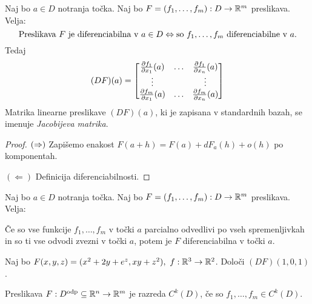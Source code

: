 \begin{izrek}
    Naj bo $a \in D$ notranja točka. Naj bo $F = (f_1, \ldots, f_m): D \to \mathbb{R}^m$ preslikava. Velja: 
    $$\text{Preslikava } F \text{ je diferenciabilna v } a \in D \Leftrightarrow \text{so } f_1, \ldots, f_m \text{ diferenciabilne v } a.$$
    Tedaj
    $$(DF)(a) = \begin{bmatrix}
        \frac{\partial f_1}{\partial x_1}(a) & \ldots & \frac{\partial f_1}{\partial x_n}(a) \\
        \vdots & & \vdots \\
        \frac{\partial f_m}{\partial x_1}(a) & \ldots & \frac{\partial f_m}{\partial x_n}(a) 
    \end{bmatrix}$$
    Matrika linearne preslikave $(DF)(a)$, ki je zapisana v standardnih bazah, se imenuje \emph{Jacobijeva matrika}.
\end{izrek}

\begin{proof}
    $(\Rightarrow)$ Zapišemo enakost $F(a+h) = F(a) + dF_a(h) + o(h)$ po komponentah.

    $(\Leftarrow)$ Definicija diferenciabilnosti.
\end{proof}

\begin{posledica}
    Naj bo $a \in D$ notranja točka. Naj bo $F = (f_1, \ldots, f_m): D \to \mathbb{R}^m$ preslikava. Velja:
    
    Če so vse funkcije $f_1, \ldots, f_m$ v točki $a$ parcialno odvedlivi po vseh spremenljivkah in so ti vse odvodi zvezni v točki $a$, potem je $F$ diferenciabilna v točki $a$.
\end{posledica}

\begin{zgled}
    Naj bo $F(x,y,z) = (x^2+2y+e^z, xy+z^2), \ f: \RR^3 \to \RR^2$. Določi $(DF)(1,0,1)$.
\end{zgled}

\begin{definicija}
    Preslikava $F: D^{\text{odp}} \subseteq \mathbb{R}^n \to \mathbb{R}^m$ je razreda $C^k(D)$, če so $f_1, \ldots, f_m \in C^k(D)$.
\end{definicija}

